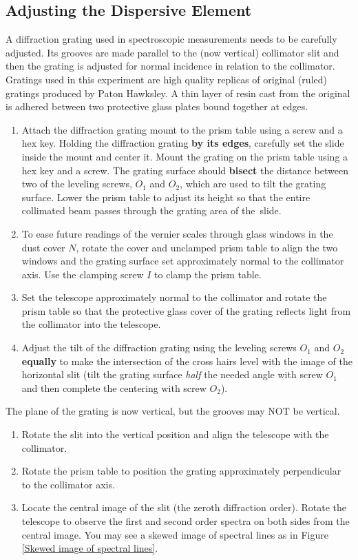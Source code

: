 \documentclass[12pt]{article}
\begin{document}
\subsection{Adjusting the Dispersive Element}
A diffraction grating used in spectroscopic measurements needs to be carefully adjusted. Its grooves are made parallel to the (now vertical) collimator slit and then the grating is adjusted for normal incidence in relation to the collimator.  Gratings used in this experiment are high quality replicas of original (ruled) gratings produced by Paton Hawksley. A thin layer of resin cast from the original is adhered between two protective glass plates bound together at edges.
\begin{enumerate}
    \item Attach the diffraction grating mount to the prism table using a screw and a hex key. Holding the diffraction grating \textbf{by its edges}, carefully set the slide inside the mount and center it. Mount the grating on the prism table using a hex key and a screw. The grating surface should \textbf{bisect} the distance between two of the leveling screws, $O_1$ and $O_2$, which are used to tilt the grating surface. Lower the prism table to adjust its height so that the entire collimated beam passes through the grating area of the~slide. 
    \item To ease future readings of the vernier scales through glass windows in the dust cover $N$, rotate the cover and unclamped prism table to align the two windows and the grating surface set approximately normal to the collimator axis. Use the clamping screw $I$ to clamp the prism table.
    \item Set the telescope approximately normal to the collimator and rotate the prism table so that the protective glass cover of the grating reflects light from the collimator into the telescope.
    \item Adjust the tilt of the diffraction grating using the leveling screws $O_1$ and $O_2$ \textbf{equally} to make the intersection of the cross hairs level with the image of the horizontal slit (tilt the grating surface \textit{half} the needed angle with screw $O_1$ and then complete the centering with screw $O_2$).
\end{enumerate}
The plane of the grating is now vertical, but the grooves may NOT be vertical.
\begin{enumerate}[resume]
    \item Rotate the slit into the vertical position and align the telescope with the collimator.
    \item Rotate the prism table to position the grating approximately perpendicular to the collimator axis. 
    \item Locate the central image of the slit (the zeroth diffraction order). Rotate the telescope to observe the first and second order spectra on both sides from the central image. You may see a skewed image of spectral lines as in Figure \ref{Skewed image of spectral lines}.
\end{enumerate}
\end{document}
